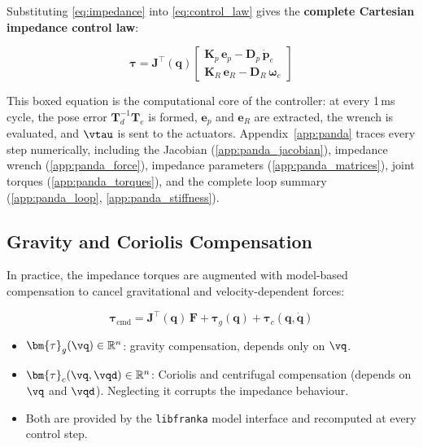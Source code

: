 Substituting \cref{eq:impedance} into \cref{eq:control_law} gives the
\textbf{complete Cartesian impedance control law}:

\begin{equation}
\label{eq:full_cl}
\boxed{
\bm{\tau} = \mathbf{J}^\top(\mathbf{q})
\begin{bmatrix}
\mathbf{K}_p\,\mathbf{e}_p - \mathbf{D}_p\,\dot{\mathbf{p}}_e \\[4pt]
\mathbf{K}_R\,\mathbf{e}_R - \mathbf{D}_R\,\boldsymbol{\omega}_e
\end{bmatrix}
}
\end{equation}

This boxed equation is the computational core of the controller:
at every 1\,ms cycle, the pose error $\mathbf{T}_d^{-1}\mathbf{T}_e$
is formed, $\mathbf{e}_p$ and $\mathbf{e}_R$ are extracted, the
wrench is evaluated, and $\vtau$ is sent to the actuators.
Appendix~\ref{app:panda} traces every step numerically, including
the Jacobian (\cref{app:panda_jacobian}), impedance wrench
(\cref{app:panda_force}), impedance parameters
(\cref{app:panda_matrices}), joint torques (\cref{app:panda_torques}),
and the complete loop summary (\cref{app:panda_loop},
\cref{app:panda_stiffness}).

\subsection{Gravity and Coriolis Compensation}

In practice, the impedance torques are augmented with model-based
compensation to cancel gravitational and velocity-dependent forces:

\begin{equation}
\label{eq:full_with_comp}
\bm{\tau}_{\mathrm{cmd}} =
\mathbf{J}^\top(\mathbf{q})\,\mathbf{F}
+ \bm{\tau}_g(\mathbf{q})
+ \bm{\tau}_c(\mathbf{q},\dot{\mathbf{q}})
\end{equation}

\begin{itemize}
  \item $\bm{\tau}_g(\vq)\in\mathbb{R}^n$: gravity compensation,
        depends only on $\vq$.
  \item $\bm{\tau}_c(\vq,\vqd)\in\mathbb{R}^n$: Coriolis
        and centrifugal compensation (depends on $\vq$ and $\vqd$).
        Neglecting it corrupts the impedance behaviour.
  \item Both are provided by the \texttt{libfranka} model interface
        and recomputed at every control step.
\end{itemize}

